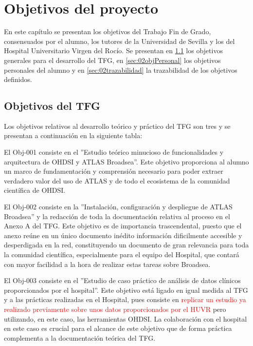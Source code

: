 \chapter{Objetivos del proyecto}\label{cap:02objetivos}

En este capítulo se presentan los objetivos del Trabajo Fin de Grado, consensuados por el alumno, los tutores de la Universidad de Sevilla y los del Hospital Universitario Virgen del Rocío. Se presentan en \ref{sec:02objTFG} los objetivos generales para el desarrollo del TFG, en \ref{sec:02objPersonal} los objetivos personales del alumno y en \ref{sec:02trazabilidad} la trazabilidad de los objetivos definidos.

\section{Objetivos del TFG} \label{sec:02objTFG}

Los objetivos relativos al desarrollo teórico y práctico del TFG son tres y se presentan a continuación en la siguiente tabla:



El Obj-001 consiste en el ''Estudio teórico minucioso de funcionalidades y arquitectura de OHDSI y ATLAS Broadsea''. Este objetivo proporciona al alumno un marco de fundamentación y comprensión necesario para poder extraer verdadero valor del uso de ATLAS y de todo el ecosistema de la comunidad científica de OHDSI.

El Obj-002 consiste en la ''Instalación, configuración y despliegue de ATLAS Broadsea'' y la redacción de toda la documentación relativa al proceso en el Anexo A del TFG. Este objetivo es de importancia trascendental, puesto que el anexo reúne en un único documento inédito información dificilmente accesible y desperdigada en la red, constituyendo un documento de gran relevancia para toda la comunidad científica, especialmente para el equipo del Hospital, que contará con mayor facilidad a la hora de realizar estas tareas sobre Broadsea.

El Obj-003 consiste en el ''Estudio de caso práctico de análisis de datos clínicos proporcionados por el hospital''. Este objetivo está ligado en igual medida al TFG y a las prácticas realizadas en el Hospital, pues consiste en \textcolor{red}{replicar un estudio ya realizado previamente sobre unos datos proporcionados por el HUVR} pero utilizando, en este caso, las herramientas OHDSI. La colaboración con el hospital en este caso es crucial para el alcance de este objetivo que de forma práctica complementa a la documentación teórica del TFG.


